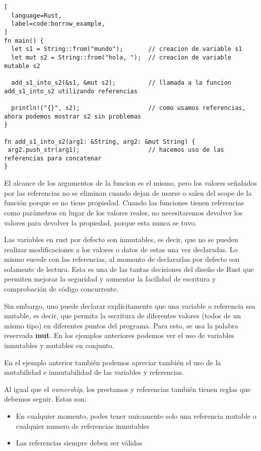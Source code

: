 \begin{lstlisting}[
  language=Rust,
  label=code:borrow_example,
]
fn main() {
  let s1 = String::from("mundo");       // creacion de variable s1
  let mut s2 = String::from("hola, ");  // creacion de variable mutable s2

  add_s1_into_s2(&s1, &mut s2);         // llamada a la funcion add_s1_into_s2 utilizando referencias

  println!("{}", s2);                   // como usamos referencias, ahora podemos mostrar s2 sin problemas
}

fn add_s1_into_s2(arg1: &String, arg2: &mut String) {
 arg2.push_str(arg1);                   // hacemos uso de las referencias para concatenar
}
\end{lstlisting}

El alcance de los argumentos de la funcion es el mismo, pero los valores señalados por las referencias no se eliminan cuando dejan de usarse o salen del scope de la función porque se no tiene propiedad. Cuando las funciones tienen referencias como parámetros en lugar de los valores reales, no necesitaremos devolver los valores para devolver la propiedad, porque esta nunca se tuvo.

Las variables en rust por defecto son inmutables, es decir, que no se pueden realizar modificaciones a los valores o datos de estas una vez declaradas. Lo mismo sucede con las referencias, al momento de declararlas por defecto son solamente de lectura. Esta es una de las tantas decisiones del diseño de Rust que permiten mejorar la seguridad y aumentar la facilidad de escritura y comprobación de código concurrente.

Sin embargo, uno puede declarar explícitamente que una variable o referencia sea mutable, es decir, que permita la escritura de diferentes valores (todos de un mismo tipo) en diferentes puntos del programa. Para esto, se usa la palabra reservada \textbf{mut}. En los ejemplos anteriores podemos ver el uso de variables inmutables y mutables en conjunto.

En el ejemplo anterior también podemos apreciar también el uso de la mutabilidad e inmutabilidad de las variables y referencias.

Al igual que el \textit{ownership}, los prestamos y referencias también tienen reglas que debemos seguir. Estas son:
\begin{itemize}
  \item En cualquier momento, podes tener unicamente solo una referencia mutable o cualquier numero de referencias inmutables
  \item Las referencias siempre deben ser válidas
\end{itemize}

